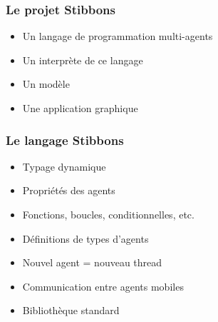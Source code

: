 \begin{frame}
\frametitle{Le projet Stibbons}
\begin{itemize}
	\item Un langage de programmation multi-agents
	\item Un interprète de ce langage
	\item Un modèle
	\item Une application graphique
\end{itemize}
\end{frame}

\begin{frame}
\frametitle{Le langage Stibbons}
\begin{itemize}
        \item Typage dynamique
        \item Propriétés des agents
        \item Fonctions, boucles, conditionnelles, etc.
        \item Définitions de types d'agents
        \item Nouvel agent = nouveau thread
        \item Communication entre agents mobiles
        \item Bibliothèque standard
\end{itemize}
\end{frame}
